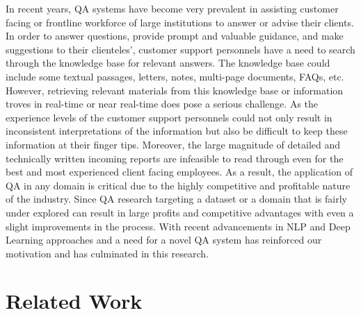 \documentclass[11pt,a4paper]{article}
\begin{document}
In recent years, QA systems have become very prevalent in assisting customer facing or frontline workforce of large institutions to answer or advise their clients. In order to answer questions, provide prompt and valuable guidance, and make suggestions to their clienteles', customer support personnels have a need to search through the knowledge base for relevant answers. The knowledge base could include some textual passages, letters, notes, multi-page documents, FAQs, etc. However, retrieving relevant materials from this knowledge base or information troves in real-time or near real-time does pose a serious challenge. As the experience levels of the customer support personnels could not only result in inconsistent interpretations of the information but also be difficult to keep these information at their finger tips. Moreover, the large magnitude of detailed and technically written incoming reports are infeasible to read through even for the best and most experienced client facing employees. As a result, the application of QA in any domain is critical due to the highly competitive and profitable nature of the industry. Since QA research targeting a dataset or a domain that is fairly under explored can result in large profits and competitive advantages with even a slight improvements in the process. With recent advancements in NLP and Deep Learning approaches and a need for a novel QA system has reinforced our motivation and has culminated in this research.

\section{Related Work}
\label{sec:length}
\end{document}
